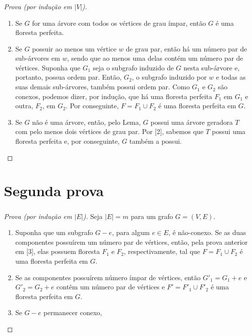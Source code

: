 \documentclass{beamer}
\begin{document}
\begin{frame}
    \frametitle{}

    \begin{proof}[Prova (por indução em $|V|$)]
        \begin{enumerate}
            \item Se $G$ for uma árvore com todos os vértices de grau ímpar, então $G$ é uma floresta perfeita.
            \item Se $G$ possuir ao menos um vértice $w$ de grau par, então há um número par de sub-árvores em $w$, sendo que ao menos uma delas contém um número par de vértices. Suponha que $G_{1}$ seja o subgrafo induzido de $G$ nesta sub-árvore e, portanto, possua ordem par. Então, $G_{2}$, o subgrafo induzido por $w$ e todas as suas demais sub-árvores, também possui ordem par. Como $G_{1}$ e $G_{2}$ são conexos, podemos dizer, por indução, que há uma floresta perfeita $F_{1}$ em $G_{1}$ e outra, $F_{2}$, em $G_{2}$. Por conseguinte, $F = F_{1} \cup F_{2}$ é uma floresta perfeita em $G$.
            \item Se $G$ não é uma árvore, então, pelo Lema, $G$ possui uma árvore geradora $T$ com pelo menos dois vértices de grau par. Por [2], sabemos que $T$ possui uma floresta perfeita e, por conseguinte, $G$ também a possui.
        \end{enumerate}
    \end{proof}

\end{frame}

\section{Segunda prova}

\begin{frame}
    \frametitle{}

    \begin{proof}[Prova (por indução em $|E|$)]
        Seja $|E| = m$ para um grafo $G = (V, E)$. 

        \begin{enumerate}
            \item Suponha que um subgrafo $G - e$, para algum $e \in E$, é não-conexo. Se as duas componentes possuírem um número par de vértices, então, pela prova anterior em [3], elas possuem floresta $F_{1}$ e $F_{2}$, respectivamente, tal que $F = F_{1} \cup F_{2}$ é uma floresta perfeita em $G$.
            \item Se as componentes possuírem número ímpar de vértices, então $G'_{1} = G_{1} + e$ e $G'_{2} = G_{2} + e$ contêm um número par de vértices e $F' = F'_{1} \cup F'_{2}$ é uma floresta perfeita em $G$.
            \item Se $G - e$ permanecer conexo, 
        \end{enumerate}
    \end{proof}

\end{frame}
\end{document}
